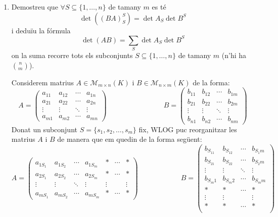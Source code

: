 \documentclass[11pt,a4paper]{article}
\begin{document}
\begin{enumerate}
    \item Demostreu que $\forall S\subseteq \{1,\ldots,n\}$ de tamany $m$ es té $$\det((BA)_S^S)=\det A_S \det B^S$$ i deduïu la fórmula $$\det (AB)=\sum_S \det A_S \det B^S$$ on la suma recorre tots els subconjunts $S\subseteq \{1,\ldots,n\}$ de tamany $m$ (n'hi ha $\binom{n}{m}$).\par
    Considerem matrius $A\in \mathcal{M}_{m\times n}(K)$ i $B\in \mathcal{M}_{n\times m}(K)$ de la forma: $$A=\begin{pmatrix}
      a_{11} & a_{12} & \cdots & a_{1n} \\
      a_{21} & a_{22} & \cdots & a_{2n} \\
      \vdots & \vdots & \ddots & \vdots \\
      a_{m1} & a_{m2} & \cdots & a_{mn}
   \end{pmatrix}\qquad\qquad\qquad\qquad
   B=\begin{pmatrix}
      b_{11} & b_{12} & \cdots & b_{1m} \\
      b_{21} & b_{22} & \cdots & b_{2m} \\
      \vdots & \vdots & \ddots & \vdots \\
      b_{n1} & b_{n2} & \cdots & b_{nm}
   \end{pmatrix}$$ Donat un subconjunt $S=\{s_1,s_2,\ldots,s_m\}$ fix, WLOG puc reorganitzar les matrius $A$ i $B$ de manera que em quedin de la forma següent:
   $$A=\begin{pmatrix}
      a_{1S_1} & a_{1S_2} & \cdots & a_{1S_m} & \ast & \cdots & \ast\\
      a_{2S_1} & a_{2S_2} & \cdots & a_{2S_m} & \ast & \cdots & \ast \\
      \vdots & \vdots & \ddots & \vdots & \vdots &  & \vdots\\
      a_{mS_1} & a_{mS_2} & \cdots & a_{mS_m} & \ast & \cdots & \ast
   \end{pmatrix}\qquad\qquad\qquad
   B=\begin{pmatrix}
      b_{S_11} & b_{S_12} & \cdots & b_{S_1m} \\
      b_{S_21} & b_{S_22} & \cdots & b_{S_2m} \\
      \vdots & \vdots & \ddots & \vdots \\
      b_{S_m1} & b_{S_m2} & \cdots & b_{S_mm} \\
      \ast & \ast & \cdots & \ast \\
      \vdots & \vdots &  & \vdots \\
      \ast & \ast & \cdots & \ast \\

\end{pmatrix}$$
\end{enumerate}
\end{document}
